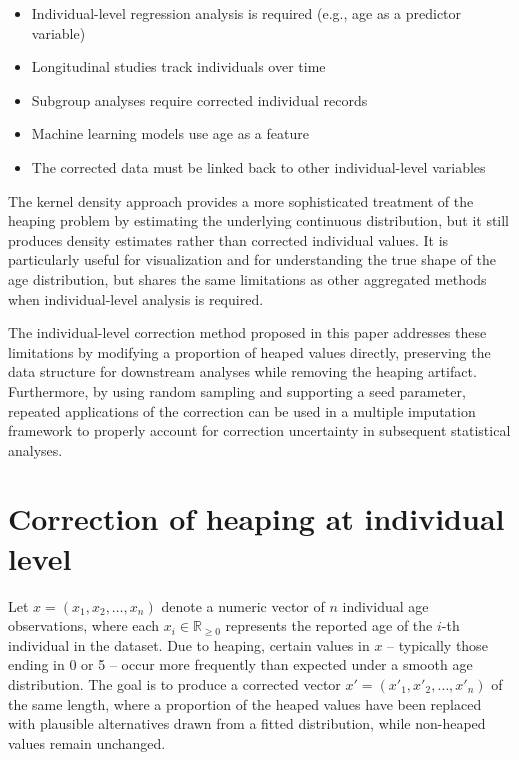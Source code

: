 \documentclass[pdflatex,sn-mathphys-num]{sn-jnl}%
\theoremstyle{thmstyleone}%
\theoremstyle{thmstyletwo}%
\theoremstyle{thmstylethree}%
\begin{document}
\begin{itemize}
    \item Individual-level regression analysis is required (e.g., age as a predictor variable)
    \item Longitudinal studies track individuals over time
    \item Subgroup analyses require corrected individual records
    \item Machine learning models use age as a feature
    \item The corrected data must be linked back to other individual-level variables
\end{itemize}

The kernel density approach \citep{kernelheaping} provides a more sophisticated treatment of the heaping problem by estimating the underlying continuous distribution, but it still produces density estimates rather than corrected individual values. It is particularly useful for visualization and for understanding the true shape of the age distribution, but shares the same limitations as other aggregated methods when individual-level analysis is required.

The individual-level correction method proposed in this paper addresses these limitations by modifying a proportion of heaped values directly, preserving the data structure for downstream analyses while removing the heaping artifact. Furthermore, by using random sampling and supporting a seed parameter, repeated applications of the correction can be used in a multiple imputation framework to properly account for correction uncertainty in subsequent statistical analyses.


\section{Correction of heaping at individual level}

Let $x = (x_1, x_2, \ldots, x_n)$ denote a numeric vector of $n$ individual age 
observations, where each $x_i \in \mathbb{R}_{\geq 0}$ represents the reported 
age of the $i$-th individual in the dataset. Due to heaping, certain values in $x$ -- typically those ending in 0 or 5 -- occur more frequently than expected under a smooth age distribution. The goal is to produce a corrected vector $x' = (x'_1, x'_2, \ldots, x'_n)$ of the same length, where a proportion of the heaped values have been replaced with plausible alternatives drawn from a fitted distribution, while non-heaped values remain unchanged.
\end{document}
